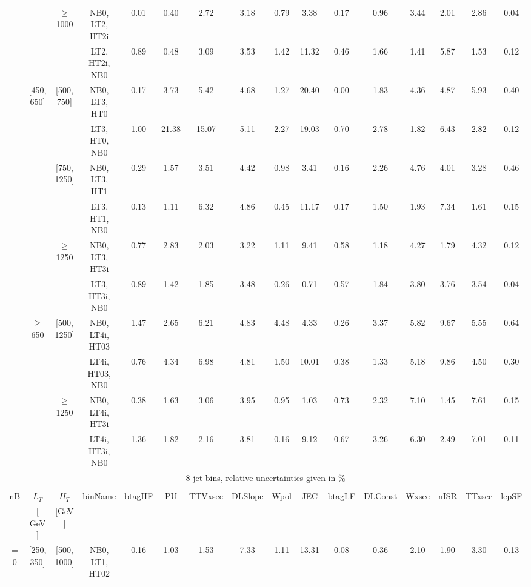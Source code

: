 \begin{sidewaystable}[ht]
\begin{center}
\begin{tabular}{|c | c | c | c | c | c | c | c | c | c | c | c | c | c | c | c | }
\cline{3-16}  & & $\geq$ 1000 &NB0, LT2, HT2i & 0.01 & 0.40 & 2.72 & 3.18 & 0.79 & 3.38 & 0.17 & 0.96 & 3.44 & 2.01 & 2.86 & 0.04 \\ 
  &  &  &LT2, HT2i, NB0 & 0.89 & 0.48 & 3.09 & 3.53 & 1.42 & 11.32 & 0.46 & 1.66 & 1.41 & 5.87 & 1.53 & 0.12 \\ 
\cline{2-16}   & [450, 650] & [500, 750]&NB0, LT3, HT0 & 0.17 & 3.73 & 5.42 & 4.68 & 1.27 & 20.40 & 0.00 & 1.83 & 4.36 & 4.87 & 5.93 & 0.40 \\ 
  &  &  &LT3, HT0, NB0 & 1.00 & 21.38 & 15.07 & 5.11 & 2.27 & 19.03 & 0.70 & 2.78 & 1.82 & 6.43 & 2.82 & 0.12 \\ 
\cline{3-16}  & & [750, 1250] &NB0, LT3, HT1 & 0.29 & 1.57 & 3.51 & 4.42 & 0.98 & 3.41 & 0.16 & 2.26 & 4.76 & 4.01 & 3.28 & 0.46 \\ 
  &  &  &LT3, HT1, NB0 & 0.13 & 1.11 & 6.32 & 4.86 & 0.45 & 11.17 & 0.17 & 1.50 & 1.93 & 7.34 & 1.61 & 0.15 \\ 
\cline{3-16}  & & $\geq$ 1250 &NB0, LT3, HT3i & 0.77 & 2.83 & 2.03 & 3.22 & 1.11 & 9.41 & 0.58 & 1.18 & 4.27 & 1.79 & 4.32 & 0.12 \\ 
  &  &  &LT3, HT3i, NB0 & 0.89 & 1.42 & 1.85 & 3.48 & 0.26 & 0.71 & 0.57 & 1.84 & 3.80 & 3.76 & 3.54 & 0.04 \\ 
\cline{2-16}   & $\geq$ 650 & [500, 1250]&NB0, LT4i, HT03 & 1.47 & 2.65 & 6.21 & 4.83 & 4.48 & 4.33 & 0.26 & 3.37 & 5.82 & 9.67 & 5.55 & 0.64 \\ 
  &  &  &LT4i, HT03, NB0 & 0.76 & 4.34 & 6.98 & 4.81 & 1.50 & 10.01 & 0.38 & 1.33 & 5.18 & 9.86 & 4.50 & 0.30 \\ 
\cline{3-16}  & & $\geq$ 1250 &NB0, LT4i, HT3i & 0.38 & 1.63 & 3.06 & 3.95 & 0.95 & 1.03 & 0.73 & 2.32 & 7.10 & 1.45 & 7.61 & 0.15 \\ 
  &  &  &LT4i, HT3i, NB0 & 1.36 & 1.82 & 2.16 & 3.81 & 0.16 & 9.12 & 0.67 & 3.26 & 6.30 & 2.49 & 7.01 & 0.11 \\ 
 \hline 
\multicolumn{16}{|c|}{8 jet bins, relative uncertainties given in \%} \\ 
\multicolumn{16}{|c|}{} \\ \hline 
nB &  $L_T$ & $H_T$ & binName & btagHF & PU & TTVxsec & DLSlope & Wpol & JEC & btagLF & DLConst & Wxsec & nISR & TTxsec & lepSF  \\ 
   & $[$ GeV $]$  &  $[$GeV$]$  &  &  &  &  &  &  &  &  &  &  &  &  &   \\ \hline 
\cline{1-16} $=$ 0 & [250, 350] & [500, 1000]&NB0, LT1, HT02 & 0.16 & 1.03 & 1.53 & 7.33 & 1.11 & 13.31 & 0.08 & 0.36 & 2.10 & 1.90 & 3.30 & 0.13 \\ 

\end{tabular}
\end{center}
\end{sidewaystable}
